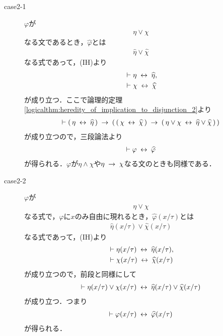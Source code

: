 \begin{sketch}
\begin{description}
\begin{description}
				\item[case2-1] 
					$\varphi$が
					\begin{align}
						\eta \vee \chi
					\end{align}
					なる文であるとき，$\widehat{\varphi}$とは
					\begin{align}
						\widehat{\eta} \vee \widehat{\chi}
					\end{align}
					なる式であって，(IH)より
					\begin{align}
						&\vdash \eta \hspace{0.25em}\leftrightarrow\hspace{0.25em} \widehat{\eta}, \\
						&\vdash \chi \hspace{0.25em}\leftrightarrow\hspace{0.25em} \widehat{\chi}
					\end{align}
					が成り立つ．ここで論理的定理\ref{logicalthm:heredity_of_implication_to_disjunction_2}より
					\begin{align}
						\vdash (\, \eta \hspace{0.25em}\leftrightarrow\hspace{0.25em} \widehat{\eta}\, ) \hspace{0.25em}\rightarrow\hspace{0.25em} (\, (\, \chi \hspace{0.25em}\leftrightarrow\hspace{0.25em} \widehat{\chi}\, )
						\hspace{0.25em}\rightarrow\hspace{0.25em} (\, \eta \vee \chi \hspace{0.25em}\leftrightarrow\hspace{0.25em} \widehat{\eta} \vee \widehat{\chi}\, )\, )
					\end{align}
					が成り立つので，三段論法より
					\begin{align}
						\vdash \varphi \hspace{0.25em}\leftrightarrow\hspace{0.25em} \widehat{\varphi}
					\end{align}
					が得られる．$\varphi$が$\eta \wedge \chi$や$\eta \hspace{0.25em}\rightarrow\hspace{0.25em} \chi$なる文のときも同様である．
					
				\item[case2-2] $\varphi$が
					\begin{align}
						\eta \vee \chi
					\end{align}
					なる式で，$\varphi$に$x$のみ自由に現れるとき，$\widehat{\varphi}(x/\tau)$とは
					\begin{align}
						\widehat{\eta}(x/\tau) \vee \widehat{\chi}(x/\tau)
					\end{align}
					なる式であって，(IH)より
					\begin{align}
						&\vdash \eta(x/\tau) \hspace{0.25em}\leftrightarrow\hspace{0.25em} \widehat{\eta}(x/\tau), \\
						&\vdash \chi(x/\tau) \hspace{0.25em}\leftrightarrow\hspace{0.25em} \widehat{\chi}(x/\tau)
					\end{align}
					が成り立つので，前段と同様にして
					\begin{align}
						\vdash \eta(x/\tau) \vee \chi(x/\tau) \hspace{0.25em}\leftrightarrow\hspace{0.25em} \widehat{\eta}(x/\tau) \vee \widehat{\chi}(x/\tau)
					\end{align}
					が成り立つ．つまり
					\begin{align}
						\vdash \varphi(x/\tau) \hspace{0.25em}\leftrightarrow\hspace{0.25em} \widehat{\varphi}(x/\tau)
					\end{align}
					が得られる．
					

\end{description}
\end{description}
\end{sketch}
